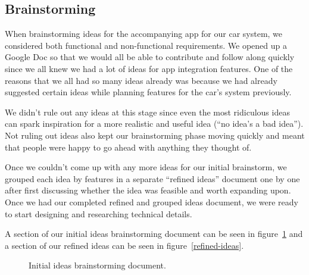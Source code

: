 \documentclass{article}
\begin{document}
\subsection{Brainstorming}\label{ssec:app-brainstorming} %
When brainstorming ideas for the accompanying app for our car system, we considered both functional and non-functional requirements. We opened up a Google Doc so that we would all be able to contribute and follow along quickly since we all knew we had a lot of ideas for app integration features. One of the reasons that we all had so many ideas already was because we had already suggested certain ideas while planning features for the car's system previously.

We didn't rule out any ideas at this stage since even the most ridiculous ideas can spark inspiration for a more realistic and useful idea (``no idea's a bad idea''). Not ruling out ideas also kept our brainstorming phase moving quickly and meant that people were happy to go ahead with anything they thought of.

Once we couldn't come up with any more ideas for our initial brainstorm, we grouped each idea by features in a separate ``refined ideas'' document one by one after first discussing whether the idea was feasible and worth expanding upon. Once we had our completed refined and grouped ideas document, we were ready to start designing and researching technical details.

A section of our initial ideas brainstorming document can be seen in figure~\ref{initial-ideas} and a section of our refined ideas can be seen in figure~\ref{refined-ideas}.

\begin{figure}[H]
  \centering
  \caption{Initial ideas brainstorming document.}\label{initial-ideas}
\end{figure}
\end{document}
